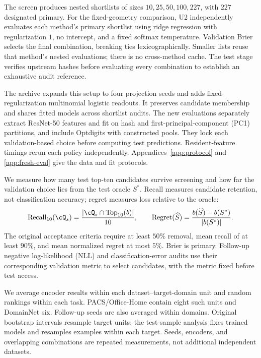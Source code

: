 The screen produces nested shortlists of sizes $10,25,50,100,227$, with $227$ designated primary. For the fixed-geometry comparison, U2 independently evaluates each method's primary shortlist using ridge regression with regularization $1$, no intercept, and a fixed softmax temperature. Validation Brier selects the final combination, breaking ties lexicographically. Smaller lists reuse that method's nested evaluations; there is no cross-method cache. The test stage verifies upstream hashes before evaluating every combination to establish an exhaustive audit reference.

The archive expands this setup to four projection seeds and adds fixed-regularization multinomial logistic readouts. It preserves candidate membership and shares fitted models across shortlist audits. The new evaluations separately extract ResNet-50 features and fit on hash and first-principal-component (PC1) partitions, and include Optdigits with constructed pools. They lock each validation-based choice before computing test predictions. Resident-feature timings rerun each policy independently. Appendices~\ref{app:protocol} and \ref{app:fresh-eval} give the data and fit protocols.

We measure how many test top-ten candidates survive screening and how far the validation choice lies from the test oracle $S^*$. Recall measures candidate retention, not classification accuracy; regret measures loss relative to the oracle:
\begin{equation}
 \mathrm{Recall}_{10}(\cQ_s)=\frac{|\cQ_s\cap\mathrm{Top}_{10}(b)|}{10},\qquad
 \mathrm{Regret}(\widehat S)=\frac{b(\widehat S)-b(S^*)}{|b(S^*)|}.
 \label{eq:metrics}
\end{equation}
The original acceptance criteria require at least $50\%$ removal, mean recall of at least $90\%$, and mean normalized regret at most $5\%$. Brier is primary. Follow-up negative log-likelihood (NLL) and classification-error audits use their corresponding validation metric to select candidates, with the metric fixed before test access.

We average encoder results within each dataset--target-domain unit and random rankings within each task. PACS/Office-Home contain eight such units and DomainNet six. Follow-up seeds are also averaged within domains. Original bootstrap intervals resample target units; the test-sample analysis fixes trained models and resamples examples within each target. Seeds, encoders, and overlapping combinations are repeated measurements, not additional independent datasets.

